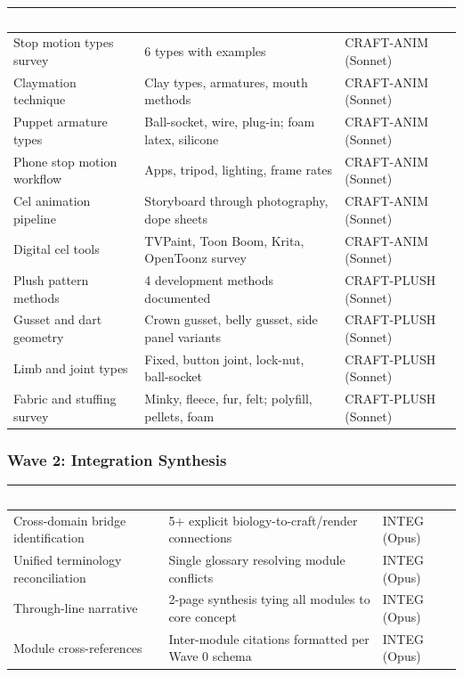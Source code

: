 \documentclass[11pt,letterpaper]{article}
\newcommand{\tableheader}[1]{\textbf{\sffamily\textcolor{white}{#1}}}
\begin{document}
\begin{center}
\begin{tabularx}{\textwidth}{L{3.5cm}XC{2cm}}
\toprule
{}
\tableheader{Task} & \tableheader{Output} & \tableheader{Agent} \\
\midrule
Stop motion types survey & 6 types with examples & CRAFT-ANIM (Sonnet) \\
Claymation technique & Clay types, armatures, mouth methods & CRAFT-ANIM (Sonnet) \\
Puppet armature types & Ball-socket, wire, plug-in; foam latex, silicone & CRAFT-ANIM (Sonnet) \\
Phone stop motion workflow & Apps, tripod, lighting, frame rates & CRAFT-ANIM (Sonnet) \\
Cel animation pipeline & Storyboard through photography, dope sheets & CRAFT-ANIM (Sonnet) \\
Digital cel tools & TVPaint, Toon Boom, Krita, OpenToonz survey & CRAFT-ANIM (Sonnet) \\
Plush pattern methods & 4 development methods documented & CRAFT-PLUSH (Sonnet) \\
Gusset and dart geometry & Crown gusset, belly gusset, side panel variants & CRAFT-PLUSH (Sonnet) \\
Limb and joint types & Fixed, button joint, lock-nut, ball-socket & CRAFT-PLUSH (Sonnet) \\
Fabric and stuffing survey & Minky, fleece, fur, felt; polyfill, pellets, foam & CRAFT-PLUSH (Sonnet) \\
\bottomrule
\end{tabularx}
\end{center}

\subsubsection{Wave 2: Integration Synthesis}

\begin{center}
\begin{tabularx}{\textwidth}{L{4cm}XC{2cm}}
\toprule
{}
\tableheader{Task} & \tableheader{Output} & \tableheader{Agent} \\
\midrule
Cross-domain bridge identification & 5+ explicit biology-to-craft/render connections & INTEG (Opus) \\
Unified terminology reconciliation & Single glossary resolving module conflicts & INTEG (Opus) \\
Through-line narrative & 2-page synthesis tying all modules to core concept & INTEG (Opus) \\
Module cross-references & Inter-module citations formatted per Wave 0 schema & INTEG (Opus) \\
\bottomrule
\end{tabularx}
\end{center}
\end{document}
